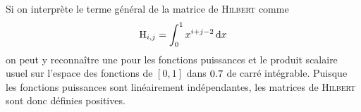 Si on interprète le terme général de la matrice de \textsc{Hilbert} comme 
$$\mathrm{H}_{i,j} = \int_{0}^{1} x^{i+j-2} \, \mathrm{d} x$$
on peut y reconnaître une  pour les fonctions puissances et le produit scalaire usuel sur l'espace des fonctions de $[0, 1]$ dans $0.7$ de carré intégrable. Puisque les fonctions puissances sont linéairement indépendantes, les matrices de \textsc{Hilbert} sont donc définies positives.
